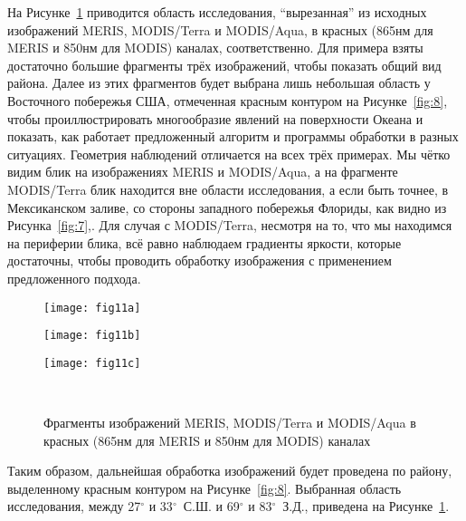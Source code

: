 На Рисунке~\ref{fig:11} приводится область исследования, ``вырезанная'' из исходных изображений MERIS, MODIS/Terra и MODIS/Aqua, в красных (865нм для MERIS и 850нм для MODIS) каналах, соответственно. Для примера взяты достаточно большие фрагменты трёх изображений, чтобы показать общий вид района. Далее из этих фрагментов будет выбрана лишь небольшая область у Восточного побережья США, отмеченная красным контуром на Рисунке~\ref{fig:8}, чтобы проиллюстрировать многообразие явлений на поверхности Океана и показать, как работает предложенный алгоритм и программы обработки в разных ситуациях. Геометрия наблюдений отличается на всех трёх примерах. Мы чётко видим блик на изображениях MERIS и MODIS/Aqua, а на фрагменте MODIS/Terra блик находится вне области исследования, а если быть точнее, в Мексиканском заливе, со стороны западного побережья Флориды, как видно из Рисунка~\ref{fig:7},. Для случая с MODIS/Terra, несмотря на то, что мы находимся на периферии блика, всё равно наблюдаем градиенты яркости, которые достаточны, чтобы проводить обработку изображения с применением предложенного подхода.



\begin{figure}[H]
    	\centering
	\begin{minipage}{.31\textwidth}
	    \subcaptionbox{\label{fig:11a}}
		{\texttt{[image: fig11a]}}
	\end{minipage}
	\hfill
	\begin{minipage}{.31\textwidth}
	    \subcaptionbox{\label{fig:11b}}
		{\texttt{[image: fig11b]}}
	\end{minipage}
	\hfill
	\begin{minipage}{.31\textwidth}
	    \subcaptionbox{\label{fig:11c}}
		{\texttt{[image: fig11c]}}
	\end{minipage}
	\\
    \caption{Фрагменты изображений MERIS, MODIS/Terra и MODIS/Aqua в красных (865нм для MERIS и 850нм для MODIS) каналах}
    \label{fig:11}
\end{figure}

Таким образом, дальнейшая обработка изображений будет проведена по району, выделенному красным контуром на Рисунке~\ref{fig:8}. Выбранная область исследования, между 27${}^\circ$ и 33${}^\circ$~С.Ш. и 69${}^\circ$ и 83${}^\circ$~З.Д., приведена на Рисунке~\ref{fig:11}.

